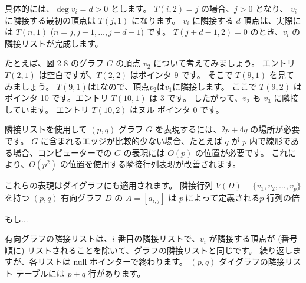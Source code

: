 
具体的には、$\deg v_i = d > 0$ とします。 $T(i,2) = j$ の場合、$j > 0$ となり、
$v_i$ に隣接する最初の頂点は $T(j,1)$ になります。 $v_i$ に隣接する $d$ 頂点は、実際には $T(n, 1)$ ($n = j, j+1, \dots, j+d-1$) です。 $T(j+d-1, 2) = 0$ のとき、$v_i$ の隣接リストが完成します。

たとえば、図 2-8 のグラフ $G$ の頂点 $v_2$ について考えてみましょう。 エントリ $T(2, 1)$ は空白ですが、$T(2,2)$ はポインタ 9 です。 そこで $T(9,1)$ を見てみましょう。 $T(9,1)$は1なので、頂点$v_2$は$v_1$に隣接します。 ここで $T(9,2)$ はポインタ 10 です。エントリ $T(10, 1)$ は 3 です。 したがって、$v_2$ も $v_3$ に隣接しています。 エントリ $T(10, 2)$ はヌル ポインタ 0 です。

隣接リストを使用して $(p, q)$ グラフ $G$ を表現するには、$2p+4q$ の場所が必要です。 $G$ に含まれるエッジが比較的少ない場合、たとえば $q$ が $p$ 内で線形である場合、コンピューターでの $G$ の表現には $O(p)$ の位置が必要です。 これにより、$O(p^2)$ の位置を使用する隣接行列表現が改善されます。

これらの表現はダイグラフにも適用されます。 隣接行列
$V(D) = \{v_1, v_2, \dots, v_p \}$ を持つ $(p,q)$ 有向グラフ $D$ の $A = [a_{i,j}]$ は $p \ によって定義される p$ 行列の倍

もし...

有向グラフの隣接リストは、$i$ 番目の隣接リストで、$v_i$ が隣接する頂点が (番号順に) リストされることを除いて、グラフの隣接リストと同じです。 繰り返しますが、各リストは null ポインターで終わります。 $(p, q)$ ダイグラフの隣接リスト テーブルには $p+q$ 行があります。
